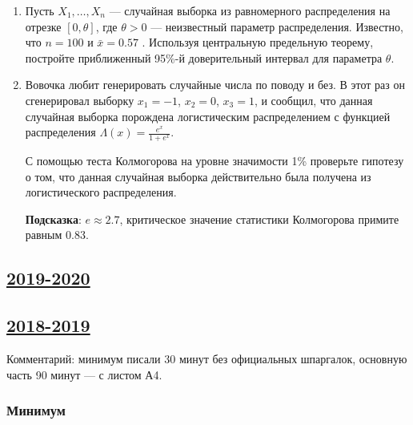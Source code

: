 \begin{enumerate}
\item Пусть $X_{1}, \ldots, X_{n}$  — случайная выборка из равномерного распределения на отрезке $[0,\theta]$, где $\theta>0$ — неизвестный параметр распределения. Известно, что $n=100$  и $\bar x=0.57$ . Используя центральную предельную теорему, постройте приближенный 95\%-й доверительный интервал для параметра $\theta$.

\item Вовочка любит генерировать случайные числа по поводу и без. 
В этот раз он сгенерировал выборку $x_{1}=-1$, $x_{2}=0$, $x_{3}=1$, и сообщил, 
что данная случайная выборка порождена логистическим распределением с функцией распределения $\Lambda(x)=\frac{e^{x}}{1+e^{x}}$. 

С помощью теста Колмогорова на уровне значимости 1\% проверьте гипотезу о том, 
что данная случайная выборка действительно была получена из логистического распределения. 

\textbf{Подсказка}: $e \approx 2.7$, критическое значение статистики Колмогорова примите равным $0.83$.

\end{enumerate}
	


\subsection[2019-2020]{\hyperref[sec:sol_kr_04_2019_2020]{2019-2020}}
\label{sec:kr_04_2019_2020}



\subsection[2018-2019]{\hyperref[sec:sol_kr_04_2018_2019]{2018-2019}}
\label{sec:kr_04_2018_2019}

Комментарий: минимум писали 30 минут без официальных шпаргалок, основную часть 90 минут — с листом А4. 

\subsubsection*{Минимум}



